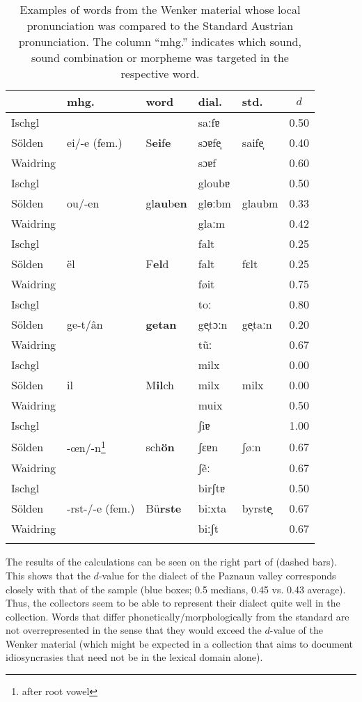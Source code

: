 \documentclass[output=paper]{langscibook}
\begin{document}
\begin{table}
\begin{tabular}{lllllc}
\lsptoprule
 & {mhg.}  & {word} & {dial.} & {std.} & {$d$}\\
 \midrule
Ischgl &  &  & saːfɐ & & 0.50\\
Sölden & ei/-e (fem.) & S\textbf{ei}f\textbf{e} & sɔɐfe̞ & saife̞ & 0.40\\
Waidring &  &  & sɔɐf &  & 0.60\\
\midrule
Ischgl & & & gloubɐ & & 0.50\\
Sölden & ou/-en & gl\textbf{au}b\textbf{en} & glɵːbm & glaubm & 0.33\\
Waidring &  &  & glaːm &  & 0.42\\
\midrule
Ischgl & & & falt & & 0.25\\
Sölden & ël & F\textbf{el}d & falt & fɛlt & 0.25\\
Waidring &  &  & føit &  & 0.75\\
\midrule
Ischgl & & & toː & & 0.80\\
Sölden & ge-t/ân  & \textbf{getan} & ge̞tɔːn &   ge̞taːn & 0.20\\
Waidring &  &  & tũː &  & 0.67\\
\midrule
Ischgl &  &  & milx &  & 0.00\\
Sölden & il & M\textbf{il}ch & milx & milx & 0.00\\
Waidring &  &  & muix &  & 0.50\\
\midrule
Ischgl &  & & ʃiɐ &  & 1.00\\
Sölden &  -œn/-n\footnote{after root vowel}& sch\textbf{ön} & ʃɛɐn & ʃøːn & 0.67\\
Waidring &  &  & ʃẽː &  & 0.67\\
\midrule
Ischgl &  & & birʃtɐ & & 0.50\\
Sölden & -rst-/-e (fem.) & Bü\textbf{rste} & biːxta & byrste̞ & 0.67\\
Waidring &  &  & biːʃt &  & 0.67\\
\lspbottomrule
\end{tabular}
\caption{\label{tab:kathrein:9} Examples of words from the Wenker material whose local pronunciation was compared to the Standard Austrian pronunciation. The column “mhg.” indicates which sound, sound combination or morpheme was targeted in the respective word.}
\end{table}

The results of the calculations can be seen on the right part of  (dashed bars). This shows that the $d$-value for the dialect of the Paznaun valley corresponds closely with that of the sample (blue boxes; 0.5 medians, 0.45 vs. 0.43 average). Thus, the collectors seem to be able to represent their dialect quite well in the collection. Words that differ phonetically\slash morphologically from the standard are not overrepresented in the sense that they would exceed the $d$-value of the Wenker material (which might be expected in a collection that aims to document idiosyncrasies that need not be in the lexical domain alone).
\end{document}
